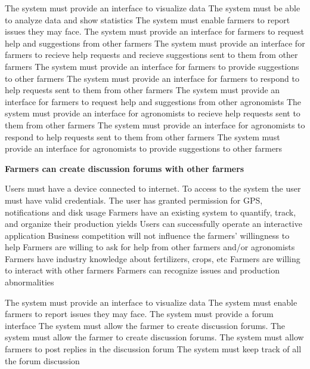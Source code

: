 \begin{itemize}
\begin{itemize}
 The system must provide an interface to visualize data
 The system must be able to analyze data and show statistics
 The system must enable farmers to report issues they may face.
 The system must provide an interface for farmers to request help and suggestions from other farmers
 The system must provide an interface for farmers to recieve help requests and recieve suggestions sent to them from other farmers
 The system must provide an interface for farmers to provide suggestions to other farmers
 The system must provide an interface for farmers to respond to help requests sent to them from other farmers
 The system must provide an interface for farmers to request help and suggestions from other agronomists
 The system must provide an interface for agronomists to recieve help requests sent to them from other farmers
 The system must provide an interface for agronomists to respond to help requests sent to them from other farmers 
 The system must provide an interface for agronomists to provide suggestions to other farmers
\end{itemize}

 \textbf{Farmers can create discussion forums with other farmers}
\begin{itemize}
  Users must have a device connected to internet.
 To access to the system the user must have valid credentials.
 The user has granted permission for GPS, notifications and disk usage
 Farmers have an existing system to quantify, track, and organize their production yields
 Users can successfully operate an interactive application
 Business competition will not influence the farmers' willingness to help
 Farmers are willing to ask for help from other farmers and/or agronomists
 Farmers have industry knowledge about fertilizers, crops, etc 
 Farmers are willing to interact with other farmers 
 Farmers can recognize issues and production abnormalities


 The system must provide an interface to visualize data
 The system must enable farmers to report issues they may face.
  The system must provide a forum interface
  The system must allow the farmer to create discussion forums.
  The system must allow the farmer to create discussion forums.
  The system must allow farmers to post replies in the discussion forum
  The system must keep track of all the forum discussion
\end{itemize}


\end{itemize}
